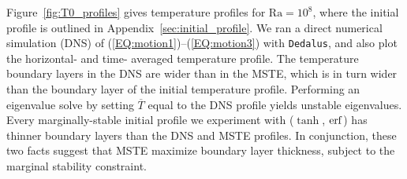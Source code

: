 \documentclass[reprint,amsmath,amssymb,aps,nofootinbib]{revtex4-1}
\newcommand\Ra{\mathrm{Ra}}
\newcommand{\eqss}[2]{(\ref{#1})--(\ref{#2})}
\begin{document}
Figure~\ref{fig:T0_profiles} gives temperature profiles for $\Ra = 10^8$, where the initial profile is outlined in Appendix~\ref{sec:initial_profile}. 
We ran a direct numerical simulation (DNS) of \eqss{EQ:motion1}{EQ:motion3} with \texttt{Dedalus}, and also plot the horizontal- and time- averaged temperature profile. 
The temperature boundary layers in the DNS are wider than in the MSTE, which is in turn wider than the boundary layer of the initial temperature profile.
Performing an eigenvalue solve by setting $\overline{T}$ equal to the DNS profile yields unstable eigenvalues. 
Every marginally-stable initial profile we experiment with ($\tanh$, $\rm{erf}$) has thinner boundary layers than the DNS and MSTE profiles.
In conjunction, these two facts suggest that MSTE maximize boundary layer thickness, subject to the marginal stability constraint.
\end{document}
